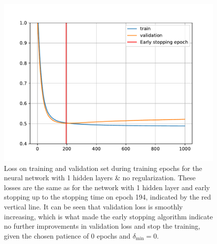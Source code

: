 \begin{figure}
    \centering
    \includegraphics[width=\textwidth]{pics/figure_Credit_NN_1hidden_noreg_loss.pdf}
    \caption{Loss on training and validation set during training epochs for the neural network with 1 hidden layers \& no regularization. These losses are the same as for the network with 1 hidden layer and early stopping up to the stopping time on epoch 194, indicated by the red vertical line. It can be seen that validation loss is smoothly increasing, which is what made the early stopping algorithm indicate no further improvements in validation loss and stop the training, given the chosen patience of 0 epochs and $\delta_{\text{min}} = 0$.}
    \label{fig:Credit_NN_1hidden_noreg_loss}
\end{figure}
\clearpage
